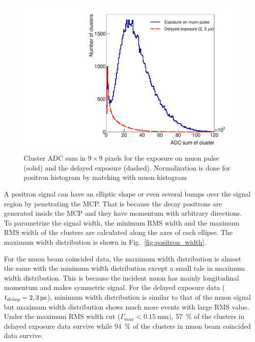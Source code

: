 \documentclass[preprint,3p,twocolumn]{elsarticle}
\begin{document}
\begin{figure}[tbp]
	\centering
	\includegraphics[width=\columnwidth]{figure/Integ_legend_v2.pdf}
	\caption{Cluster ADC sum in $9\times9$ pixels for the exposure on muon pulse (solid) and the delayed exposure (dashed).
		Normalization is done for positron histogram by matching with muon histogram}
	\vspace{-0.2cm}
	\label{fig:BPM_int}
\end{figure}

A positron signal can have an elliptic shape or even several bumps over the signal region by penetrating the MCP. That is because the decay positrons are generated inside the MCP and they have momentum with arbitrary directions. To parametrize the signal width, the minimum RMS width and the maximum RMS width of the clusters are calculated along the axes of each ellipse. The maximum width distribution is shown in Fig.~\ref{fig:positron_width}.

For the muon beam coincided data, the maximum width distribution is almost the same with the minimum width distribution except a small tale in maximum width distribution. This is because the incident muon has mainly longitudinal momentum and makes symmetric signal.
For the delayed exposure data
($t_{delay} = \SIlist[list-pair-separator = {, }, list-units = single]{2; 3}{\micro\s}$),
minimum width distribution is similar to that of the muon signal but maximum width distribution shows much more events with large RMS value. Under the maximum RMS width cut
($\Gamma_{max} < \SI{0.15}{\mm}$),
\SI{57}{\percent} of the clusters in delayed exposure data survive while \SI{94}{\percent} of the clusters in muon beam coincided data survive.
\end{document}
